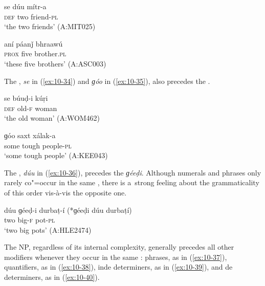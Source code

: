 \begin{exe}
\ex
\label{ex:10-32}
\gll se dúu mítr-a \\
\textsc{def} two friend-\textsc{pl} \\
\glt `the two friends' (A:MIT025)

\ex
\label{ex:10-33}
\gll aní páanǰ bhraawú \\
\textsc{prox} five brother.\textsc{pl}  \\
\glt `these five brothers' (A:ASC003)
\end{exe}

The , \textit{se} in (\ref{ex:10-34}) and \textit{ɡóo} in (\ref{ex:10-35}), also precedes the  .

\begin{exe}
\ex
\label{ex:10-34}
\gll se búuḍ-i kúṛi \\
\textsc{def} old-\textsc{f} woman \\
\glt `the old woman' (A:WOM462)

\ex
\label{ex:10-35}
\gll ɡóo saxt xálak-a \\
some tough people-\textsc{pl}  \\
\glt `some tough people' (A:KEE043)
\end{exe}


The , \textit{dúu} in (\ref{ex:10-36}), precedes the   \textit{ɡéeḍi}. Although numerals and  phrases only rarely co"=occur in the same  , there is a~strong feeling about the grammaticality of this order vis-à-vis the opposite one.

\begin{exe}
\ex
\label{ex:10-36}
\gll dúu ɡéeḍ-i durbaṭ-í (*ɡéeḍi dúu durbaṭí) \\
two big-\textsc{f} pot-\textsc{pl} \\
\glt `two big pots' (A:HLE2474)
\end{exe}


The  NP, regardless of its internal complexity, generally precedes all other modifiers
whenever they occur in the same  :  phrases, as in (\ref{ex:10-37}), quantifiers, as in (\ref{ex:10-38}), inde determiners, as in (\ref{ex:10-39}), and de determiners, as in
(\ref{ex:10-40}).

